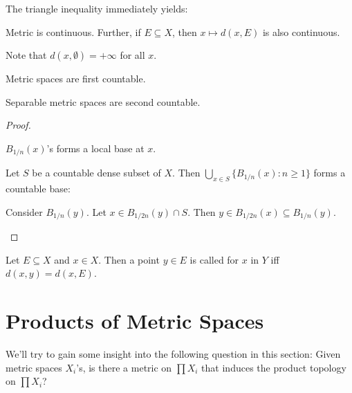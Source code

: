 	The triangle inequality immediately yields:
	
	\begin{lem}
		Metric is continuous. Further, if $E\subseteq X$, then $x\mapsto d(x, E)$ is also continuous.
	\end{lem}
	
	\begin{rmk}
		Note that $d(x, \emptyset) = +\infty$ for all $x$.
	\end{rmk}
	
	
	\begin{lem}\label{LEM: separable metric spaces are second countable}
		\leavevmode
		\begin{mylist}
			\item Metric spaces are first countable.
			\item Separable metric spaces are second countable.
		\end{mylist}
	\end{lem}
	
	\begin{proof}
		\begin{mylist}
			\item $B_{1/n}(x)$'s forms a local base at $x$.
			
			\item Let $S$ be a countable dense subset of $X$. Then $\bigcup_{x\in S}\{ B_{1/n}(x) : n\ge 1 \}$ forms a countable base:
			\begin{subproof}
				Consider $B_{1/n}(y)$. Let $x\in B_{1/2n}(y)\cap S$. Then $y\in B_{1/2n}(x)\subseteq B_{1/n}(y)$.\qedhere
			\end{subproof}
		\end{mylist}
	\end{proof}

	Let $E\subseteq X$ and $x\in X$. Then a point $y\in E$ is called  for $x$ in $Y$ iff $d(x, y) = d(x, E)$.
	
	
	
	
\section{Products of Metric Spaces}

	We'll try to gain some insight into the following question in this section: Given metric spaces $X_i$'s, is there a metric on $\prod X_i$ that induces the product topology on $\prod X_i$?
	
